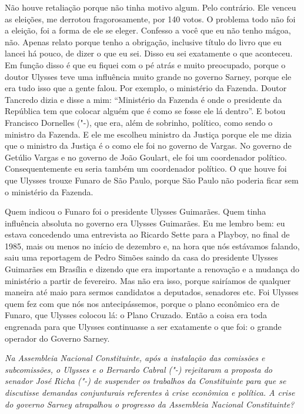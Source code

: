 Não houve retaliação porque não tinha motivo algum. Pelo
contrário. Ele venceu as eleições, me derrotou fragorosamente, por 140
votos. O problema todo não foi a eleição, foi a forma de ele se eleger.
Confesso a você que eu não tenho mágoa, não. Apenas relato porque tenho
a obrigação, inclusive título do livro que eu lancei há pouco, de dizer
o que eu sei. Disso eu sei exatamente o que aconteceu. Em função disso é
que eu fiquei com o pé atrás e muito preocupado, porque o doutor Ulysses
teve uma influência muito grande no governo Sarney, porque ele era tudo
isso que a gente falou. Por exemplo, o ministério da Fazenda. Doutor
Tancredo dizia e disse a mim: ``Ministério da Fazenda é onde o
presidente da República tem que colocar alguém que é como se fosse ele
lá dentro''. E botou Francisco Dornelles ("-), que era, além de
sobrinho, político, como sendo o ministro da Fazenda. E ele me escolheu
ministro da Justiça porque ele me dizia que o ministro da Justiça é o
como ele foi no governo de Vargas. No governo de Getúlio Vargas e no
governo de João Goulart, ele foi um coordenador político.
Consequentemente eu seria também um coordenador político. O que houve
foi que Ulysses trouxe Funaro de São Paulo, porque São Paulo não poderia
ficar sem o ministério da Fazenda.

Quem indicou o Funaro foi o presidente Ulysses Guimarães. Quem tinha
influência absoluta no governo era Ulysses Guimarães. Eu me lembro bem:
eu estava concedendo uma entrevista ao Ricardo Sette para a Playboy, no
final de 1985, mais ou menos no início de dezembro e, na hora que nós
estávamos falando, saiu uma reportagem de Pedro Simões saindo da casa do
presidente Ulysses Guimarães em Brasília e dizendo que era importante a
renovação e a mudança do ministério a partir de fevereiro. Mas não era
isso, porque sairíamos de qualquer maneira até maio para sermos
candidatos a deputados, senadores etc. Foi Ulysses quem fez com que nós
nos antecipássemos, porque o plano econômico era de Funaro, que Ulysses
colocou lá: o Plano Cruzado. Então a coisa era toda engrenada para que
Ulysses continuasse a ser exatamente o que foi: o grande operador do
Governo Sarney.

\medskip

\noindent\emph{Na Assembleia Nacional Constituinte, após a instalação das
comissões e subcomissões, o Ulysses e o Bernardo Cabral ("-)
rejeitaram a proposta do senador José Richa ("-) de suspender os
trabalhos da Constituinte para que se discutisse demandas conjunturais
referentes à crise econômica e política. A crise do governo Sarney
atrapalhou o progresso da Assembleia Nacional Constituinte?}

